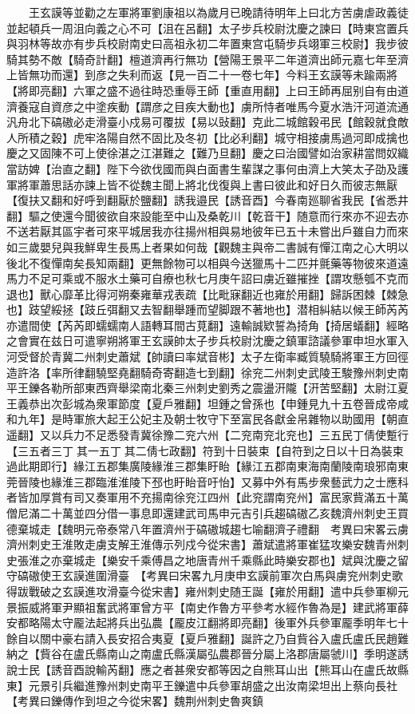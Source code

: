 　　王玄謨等並勸之左軍將軍劉康祖以為歲月已晚請待明年上曰北方苦虜虐政義徒並起頓兵一周沮向義之心不可【沮在呂翻】太子步兵校尉沈慶之諫曰【時東宫置兵與羽林等故亦有步兵校尉南史曰高祖永初二年置東宫屯騎步兵翊軍三校尉】我步彼騎其勢不敵【騎奇計翻】檀道濟再行無功【營陽王景平二年道濟出師元嘉七年至濟上皆無功而還】到彦之失利而返【見一百二十一卷七年】今料王玄謨等未踰兩將【將即亮翻】六軍之盛不過往時恐重辱王師【重直用翻】上曰王師再屈别自有由道濟養寇自資彦之中塗疾動【謂彦之目疾大動也】虜所恃者唯馬今夏水浩汗河道流通汎舟北下碻磝必走滑臺小戍易可覆拔【易以䜴翻】克此二城館穀弔民【館穀就食敵人所積之穀】虎牢洛陽自然不固比及冬初【比必利翻】城守相接虜馬過河即成擒也慶之又固陳不可上使徐湛之江湛難之【難乃旦翻】慶之曰治國譬如治家耕當問奴織當訪婢【治直之翻】陛下今欲伐國而與白面書生輩謀之事何由濟上大笑太子劭及護軍將軍蕭思話亦諫上皆不從魏主聞上將北伐復與上書曰彼此和好日久而彼志無厭【復扶又翻和好呼到翻厭於鹽翻】誘我邉民【誘音酉】今春南廵聊省我民【省悉井翻】驅之使還今聞彼欲自來設能至中山及桑乾川【乾音干】随意而行來亦不迎去亦不送若厭其區宇者可來平城居我亦往揚州相與易地彼年已五十未嘗出戶雖自力而來如三歲嬰兒與我鮮卑生長馬上者果如何哉【觀魏主與帝二書誠有憚江南之心大明以後北不復憚南矣長知兩翻】更無餘物可以相與今送獵馬十二匹并氈藥等物彼來道遠馬力不足可乘或不服水土藥可自療也秋七月庚午詔曰虜近雖摧挫【謂攻懸瓠不克而退也】獸心靡革比得河朔秦雍華戎表疏【比毗寐翻近也雍於用翻】歸訴困棘【棘急也】跂望綏拯【跂丘弭翻又去智翻舉踵而望脚跟不著地也】潜相糾結以候王師芮芮亦遣間使【芮芮即蠕蠕南人語轉耳間古莧翻】遠輸誠欵誓為掎角【掎居蟻翻】經略之會實在兹日可遣寧朔將軍王玄謨帥太子步兵校尉沈慶之鎮軍諮議參軍申坦水軍入河受督於青冀二州刺史蕭斌【帥讀曰率斌音彬】太子左衛率臧質驍騎將軍王方回徑造許洛【率所律翻驍堅堯翻騎奇寄翻造七到翻】徐兖二州刺史武陵王駿豫州刺史南平王鑠各勒所部東西齊舉梁南北秦三州刺史劉秀之震盪汧隴【汧苦堅翻】太尉江夏王義恭出次彭城為衆軍節度【夏戶雅翻】坦鍾之曾孫也【申鍾見九十五卷晉成帝咸和九年】是時軍旅大起王公妃主及朝士牧守下至富民各獻金帛雜物以助國用【朝直遥翻】又以兵力不足悉發青冀徐豫二兖六州【二兖南兖北兖也】三五民丁倩使蹔行【三五者三丁其一五丁其二倩七政翻】符到十日裝束【自符到之日以十日為裝束過此期即行】緣江五郡集廣陵緣淮三郡集盱眙【緣江五郡南東海南蘭陵南琅邪南東莞晉陵也緣淮三郡臨淮淮陵下邳也盱眙音吁怡】又募中外有馬步衆藝武力之士應科者皆加厚賞有司又奏軍用不充揚南徐兖江四州【此兖謂南兖州】富民家貲滿五十萬僧尼滿二十萬並四分借一事息即還建武司馬申元吉引兵趨碻磝乙亥魏濟州刺史王買德棄城走【魏明元帝泰常八年置濟州于碻磝城趨七喻翻濟子禮翻　考異曰宋畧云虜濟州刺史王淮敗走虜支解王淮傳示列戍今從宋書】蕭斌遣將軍崔猛攻樂安魏青州刺史張淮之亦棄城走【樂安千乘傅昌之地唐青州千乘縣此時樂安郡也】斌與沈慶之留守碻磝使王玄謨進圍滑臺　【考異曰宋畧九月庚申玄謨前軍次白馬與虜兖州刺史歌得跋戰破之玄謨進攻滑臺今從宋書】雍州刺史随王誕【雍於用翻】遣中兵參軍柳元景振威將軍尹顯祖奮武將軍曾方平【南史作魯方平參考水經作魯為是】建武將軍薛安都略陽太守龎法起將兵出弘農【龎皮江翻將即亮翻】後軍外兵參軍龎季明年七十餘自以關中豪右請入長安招合夷夏【夏戶雅翻】誕許之乃自貲谷入盧氏盧氏民趙難納之【貲谷在盧氏縣南山之南盧氏縣漢屬弘農郡晉分屬上洛郡唐屬虢川】季明遂誘說士民【誘音酉說輸芮翻】應之者甚衆安都等因之自熊耳山出【熊耳山在盧氏故縣東】元景引兵繼進豫州刺史南平王鑠遣中兵參軍胡盛之出汝南梁坦出上蔡向長社　【考異曰鑠傳作到坦之今從宋畧】魏荆州刺史魯爽鎮